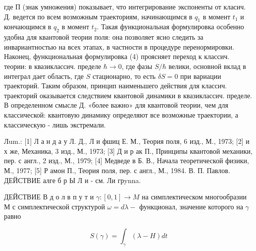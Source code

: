 \documentclass[10pt]{article}
\begin{document}
где П (знак умножения) показывает, что интегрирование экспоненты от класич. Д. ведется по всем возможным траекториям, начинающимся в $q_{1}$ в момент $t_{1}$ и кончающимся в $q_{2}$ в момент $t_{2}$. Такая функциональная формулировка особенно удобна для квантовой теории поля: она позволяет ясно следить за инвариантностью на всех этапах, в частности в процедуре перенормировки. Наконец, функциональная формулировка (4) проясняет переход к классич. теории: в квазиклассич. пределе $\hbar \rightarrow 0$, где фазы $S / \hbar$ велики, основной вклад в интеграл дает область, где $S$ стационарно, то есть $\delta S=0$ при вариации траекторий. Таким образом, принцип наименьшего действия для классич. траекторий оказывается следствием квантовой динамики в квазиклассич. пределе. В определенном смысле Д. «более важно» для квантовой теории, чем для классической: квантовую динамику определяют все возможные траектории, а классическую - лишь экстремали.



Лum.: [1] Л а н д а у Л. Д., Л и фшиц Е. М., Теория поля, 6 изд., М., 1973; [2] и х же, Механика, 3 изд., М., 1973; [3] Д и р ак П., Принципы квантовой механики, пер. с англ., 2 изд., М., 1979; [4] Медведе в Б. В., Начала теоретической физики, М., 1977; [5] Р амон П., Теория поля, пер. с англ., М., 1984. В. П. Павлов. ДЕЙСТВИЕ алге $б$ р Ы Л и - см. Ли грynna.



ДЕЙСТВИЕ В д о л в п у т и $\gamma:[0,1] \rightarrow M$ на симплектическом многообразии $М$ с симплектической структурой $\omega=d \lambda-$ функционал, значение которого на $\gamma$ равно



\[

S(\gamma)=\int_{\gamma}(\lambda-H) d t

\]
\end{document}
